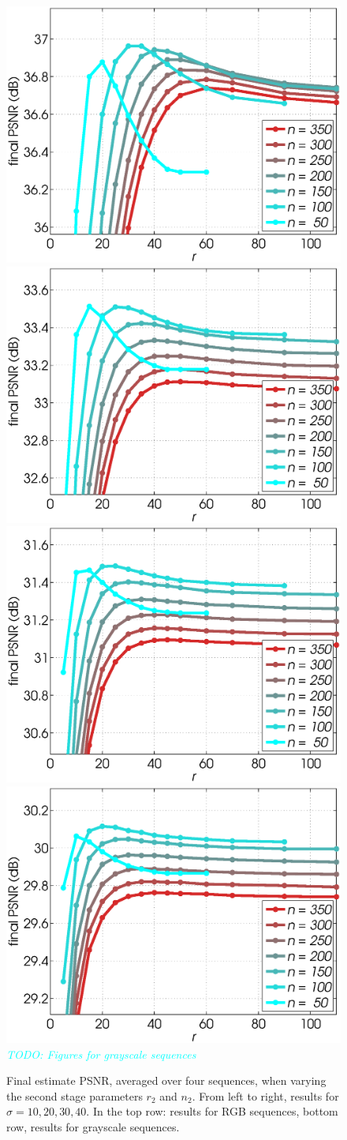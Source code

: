 \documentclass[10pt, journal, twocolumn, final, a4paper]{IEEEtran}
\newcommand{\pa}[1]{\textcolor{cyan}{#1}}
\newcommand{\pcomment}[1]{\textit{\pa{#1}}}
\begin{document}
\begin{figure}[htpb!]
	\begin{center}
		\includegraphics[width=.25\textwidth]{figs/params_tables/fpsnr_r2-np2-curves_s10_average_derf.eps}%
		\includegraphics[width=.25\textwidth]{figs/params_tables/fpsnr_r2-np2-curves_s20_average_derf.eps}%
		\includegraphics[width=.25\textwidth]{figs/params_tables/fpsnr_r2-np2-curves_s30_average_derf.eps}%
		\includegraphics[width=.25\textwidth]{figs/params_tables/fpsnr_r2-np2-curves_s40_average_derf.eps}\\

		\vspace{1cm}
		\pcomment{TODO: Figures for grayscale sequences}
		\vspace{1cm}

	\end{center}
	\caption{Final estimate PSNR, averaged over four sequences, when varying the
		second stage parameters $r_2$ and $n_2$. From left to right, results for
		$\sigma = 10, 20, 30, 40$. In the top row: results for RGB sequences, bottom
		row, results for grayscale sequences.} 
	\label{fig:rank2-nsim2-fpsnr}
\end{figure}
\end{document}
